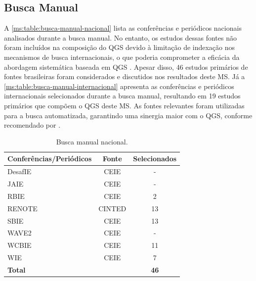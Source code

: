 \subsection{Busca Manual}
\label{ms:conducao-busca-manual}

A \autoref{ms:table:busca-manual-nacional} lista as conferências e periódicos nacionais analisados durante a busca manual. No entanto, os estudos dessas fontes não foram incluídos na composição do QGS devido à limitação de indexação nos mecanismos de busca internacionais, o que poderia comprometer a eficácia da abordagem sistemática baseada em QGS \cite{Zhang2011}. Apesar disso, 46 estudos primários de fontes brasileiras foram considerados e discutidos nos resultados deste MS. Já a \autoref{ms:table:busca-manual-internacional} apresenta as conferências e periódicos internacionais selecionados durante a busca manual, resultando em 19 estudos primários que compõem o QGS deste MS. As fontes relevantes foram utilizadas para a busca automatizada, garantindo uma sinergia maior com o QGS, conforme recomendado por .

\begin{table}[htbp]
\caption{Busca manual nacional.}
\label{ms:table:busca-manual-nacional}
\centering
\begin{tabular}{lcc}
\hline
\textbf{Conferências/Periódicos} & \textbf{Fonte} & \textbf{Selecionados} \\ \hline
DesafIE                          & CEIE           & -                     \\
JAIE                             & CEIE           & -                     \\
RBIE                             & CEIE           & 2                     \\
RENOTE                           & CINTED         & 13                    \\
SBIE                             & CEIE           & 13                    \\
WAVE2                            & CEIE           & -                     \\
WCBIE                            & CEIE           & 11                    \\
WIE                              & CEIE           & 7                     \\
\multicolumn{2}{l}{\textbf{Total}}                & \textbf{46}           \\ \hline
\end{tabular}
\end{table}

